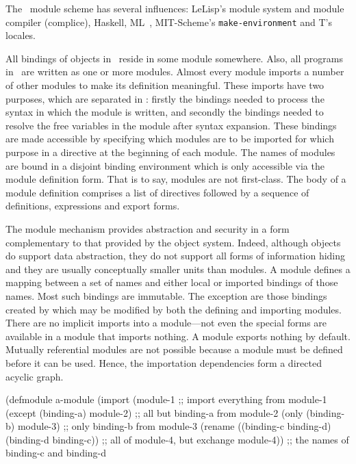 %
\label{sec:modules}
%
\begin{optDefinition}
The \eulisp\ module scheme has several influences:
LeLisp's module system and module compiler (complice),
Haskell, ML~, MIT-Scheme's {\tt make-environment} and T's locales.

All bindings of objects in \eulisp\ reside in some module somewhere.  Also, all
programs in \eulisp\ are written as one or more modules.  Almost every module
imports a number of other modules to make its definition meaningful.  These
imports have two purposes, which are separated in \eulisp: firstly the bindings
needed to process the syntax in which the module is written, and secondly the
bindings needed to resolve the free variables in the module after syntax
expansion.  These bindings are made accessible by specifying which modules are
to be imported for which purpose in a directive at the beginning of each module.
The names of modules are bound in a disjoint binding
environment which is only accessible via the module definition form.  That
is to say, modules are not first-class.  The body of a module definition
comprises a list of directives followed by a sequence of definitions,
expressions and export forms.

The module mechanism provides abstraction and security in a form complementary
to that provided by the object system.  Indeed, although objects do support data
abstraction, they do not support all forms of information hiding and they are
usually conceptually smaller units than modules.  A module defines a mapping
between a set of names and either local or imported bindings of those names.
Most such bindings are immutable.  The exception are those bindings created by
 which may be modified by both the defining and importing
modules.  There are no implicit imports into a module---not even the special
forms are available in a module that imports nothing.  A module exports nothing
by default.  Mutually referential modules are not possible because a module must
be defined before it can be used.  Hence, the importation dependencies form a
directed acyclic graph.
%
\begin{figure*}[t]
\begin{example}
\label{example:module}
\begin{center}
\begin{minipage}[t]{\textwidth}
{\small%
\syntax
(defmodule a-module
  (import
    (module-1                                        ;; import everything from module-1
     (except (binding-a) module-2)                   ;; all but binding-a from module-2
     (only (binding-b) module-3)                     ;; only binding-b from module-3
     (rename
      ((binding-c binding-d) (binding-d binding-c))  ;; all of module-4, but exchange
      module-4))                                     ;; the names of binding-c and binding-d

}
\end{minipage}
\end{center}
\end{example}
\end{figure*}
\end{optDefinition}
